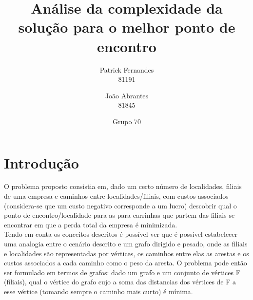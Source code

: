 \documentclass[12pt]{article}
\title{Análise da complexidade da solução para o melhor ponto de encontro}
\author{Patrick Fernandes\\81191 \and João Abrantes\\81845}
\date{Grupo 70}
\begin{document}
\maketitle
\section{Introdução}
O problema proposto consistia em, dado um certo número de localidades, filiais de uma empresa e caminhos entre localidades/filiais, com custos associados (considera-se que um custo negativo corresponde a um lucro) descobrir qual o ponto de encontro/localidade para as para carrinhas que partem das filiais se encontrar em que a perda total da empresa é minimizada.\\
\indent Tendo em conta os conceitos descritos é possível ver que é possível estabelecer uma analogia entre o cenário descrito e um grafo dirigido e pesado, onde as filiais e localidades são representadas por vértices, os caminhos entre elas as arestas e os custos associados a cada caminho como o peso da aresta. O problema pode então ser formulado em termos de grafos: dado um grafo e um conjunto de vértices F (filiais), qual o vértice do grafo cujo a soma das distancias dos vértices de F a esse vértice (tomando sempre o caminho mais curto) é mínima.
\end{document}
